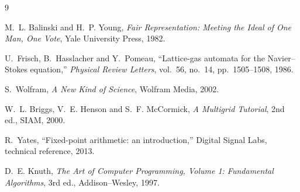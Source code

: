 \documentclass[11pt,a4paper]{article}
\theoremstyle{definition}
\begin{document}
\begin{thebibliography}{9}

M.~L. Balinski and H.~P. Young,
\emph{Fair Representation: Meeting the Ideal of One Man, One Vote},
Yale University Press, 1982.

U.~Frisch, B.~Hasslacher and Y.~Pomeau,
``Lattice-gas automata for the Navier--Stokes equation,''
\emph{Physical Review Letters}, vol.~56, no.~14, pp.~1505--1508, 1986.

S.~Wolfram,
\emph{A New Kind of Science}, Wolfram Media, 2002.

W.~L. Briggs, V.~E. Henson and S.~F. McCormick,
\emph{A Multigrid Tutorial}, 2nd ed., SIAM, 2000.

R.~Yates,
``Fixed-point arithmetic: an introduction,''
Digital Signal Labs, technical reference, 2013.

D.~E. Knuth,
\emph{The Art of Computer Programming, Volume 1: Fundamental Algorithms},
3rd ed., Addison--Wesley, 1997.

\end{thebibliography}
\end{document}
